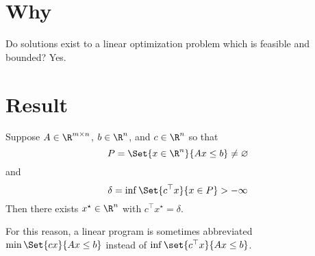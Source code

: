 
\section*{Why}

Do solutions exist to a linear optimization problem which is feasible and bounded? Yes.

\section*{Result}

\begin{proposition}
Suppose $A \in \R ^{m \times  n}$, $b \in \R ^n$, and $c \in \R ^n$ so that
\[
P = \Set{x \in \R ^n}{Ax \leq b} \neq \varnothing
\]
and
\[
\delta  = \inf \Set{c^\top x}{x \in P} > -\infty
\]
Then there exists $x^\star \in \R ^n$ with $c^\top x^\star = \delta $.
\end{proposition}

For this reason, a linear program is sometimes abbreviated $\min\Set{cx}{Ax \leq b}$ instead of $\inf\set{c^\top  x}{Ax \leq b}$.

\blankpage